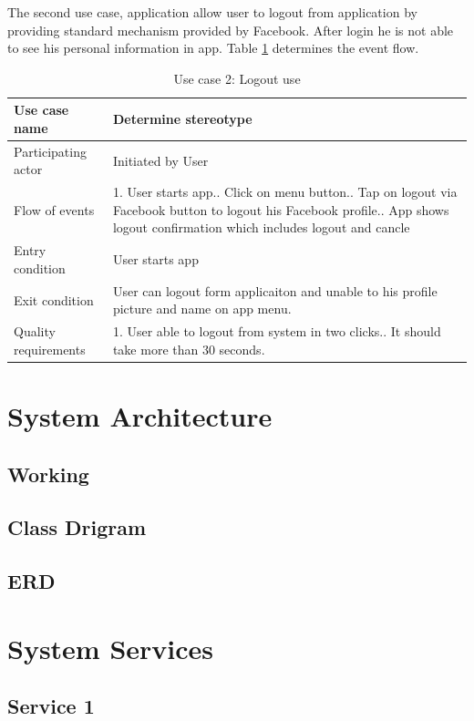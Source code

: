 \newline
 The second use case, application allow user to logout from application by providing standard mechanism provided by Facebook. After login he is not able to see his personal information in app. Table \ref{table:user_logout} determines the event flow.
 
  
  \begin{table}[ht]
  	\centering %
  	\begin{tabular}{p{4cm} p{10cm}}  %
  		\hline\hline %
  		Use case name & Determine stereotype \\ %
  		\hline %
  		
  		Participating actor & Initiated by User \\ %
  		Flow of events & 1. User starts app.\newline
  		2. Click on menu button.\newline
  		3. Tap on logout via Facebook button to logout his Facebook profile.\newline
  		4. App shows logout confirmation which includes logout and cancle \\
  		Entry condition & User starts app\\
  		Exit condition & User can logout form applicaiton and unable to his profile picture and name on app menu.\\
  		Quality requirements & 1. User able to logout from system in two clicks.\newline
  		2. It should take more than 30 seconds.\\ [1ex] %
  		\hline %
  	\end{tabular}
  	\caption{Use case 2: Logout use}
  	\label{table:user_logout}
  \end{table}
 
 
\section{System Architecture}

\subsection{Working}

\subsection{Class Drigram}

\subsection{ERD}

\section{System Services}

\subsection{Service 1}
